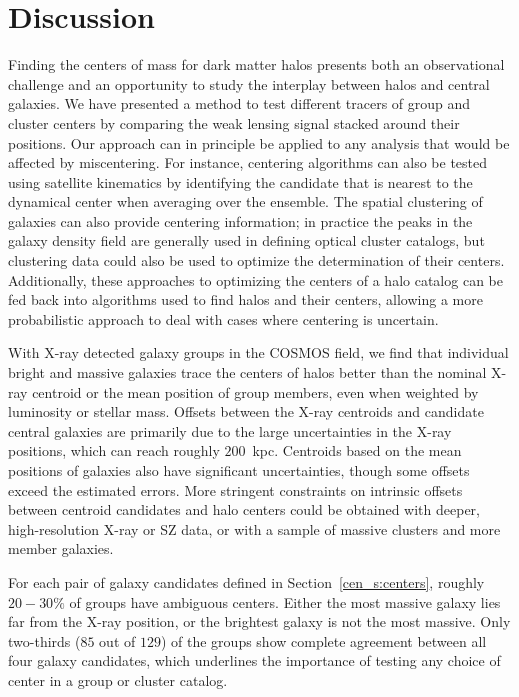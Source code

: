 
\section{Discussion}
\label{cen_s:discussion}

Finding the centers of mass for dark matter halos presents both an
observational challenge and an 
opportunity to study the interplay between halos and central
galaxies. We have presented a method to test different
tracers of group and cluster centers by comparing the weak lensing
signal stacked around their positions. Our approach can in principle
be applied to any analysis that would be affected by miscentering. For
instance, centering algorithms can also be tested using satellite
kinematics by
identifying the candidate that is nearest to the dynamical center when
averaging over the ensemble. The spatial clustering of galaxies can
also provide centering information; in practice the peaks in the
galaxy density field are generally used in defining optical cluster
catalogs, but clustering data could also be used to optimize the
determination of their centers. Additionally, these approaches to
optimizing the centers of a halo catalog can be fed back into
algorithms used to find halos and their centers, allowing a more
probabilistic approach to deal with cases where centering is uncertain.

With X-ray detected galaxy groups in the COSMOS field, we find that individual
bright and massive galaxies trace the centers of halos better than the
nominal X-ray centroid or the mean position of group members, even
when weighted by luminosity or stellar mass. Offsets between the X-ray
centroids and candidate central galaxies are primarily due to
the large uncertainties in the X-ray positions,
which can reach roughly $200$~{\rm kpc}. Centroids based on the mean
positions of galaxies also have significant uncertainties, though some
offsets exceed the estimated errors. More stringent constraints on
intrinsic offsets between centroid candidates and halo centers could
be obtained with deeper, high-resolution X-ray or SZ data, or with a
sample of massive clusters and more member galaxies.

For each pair of galaxy candidates defined in Section~\ref{cen_s:centers},
roughly $20-30\%$ of groups have ambiguous centers. Either the most
massive galaxy lies far from the X-ray position, or the brightest
galaxy is not the most massive. Only two-thirds ($85$ out of $129$) of the
groups show complete agreement between all four galaxy candidates,
which underlines the importance of testing any choice of center in a group
or cluster catalog.

